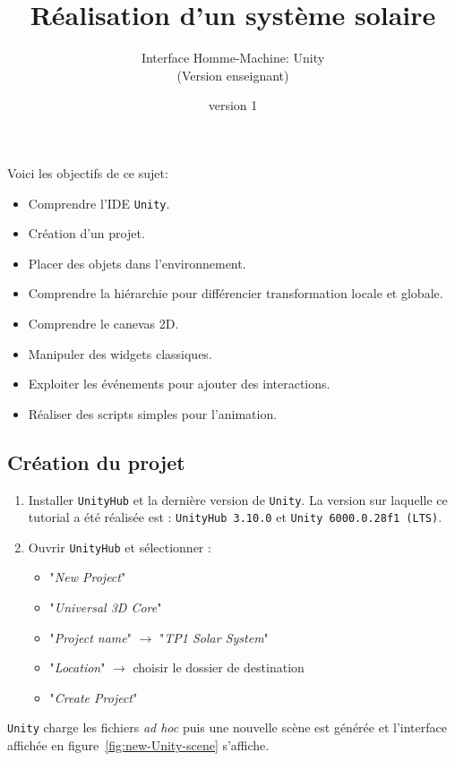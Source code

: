\documentclass[a4paper,10pt]{article}
\newenvironment{solution}%
{\begin{tcolorbox}[breakable,colback=red!5!white,colframe=red!75!black,title=Solution]}%
{\end{tcolorbox}}
\begin{document}
	


\title{\vspace*{-1cm}Réalisation d'un système solaire}
\author{\vspace*{-1.5cm}Interface Homme-Machine: Unity
\begin{ensnote}
	(Version enseignant)
\end{ensnote}
}
\date{\vspace*{-1.5cm}version 1}
\maketitle
\thispagestyle{fancy}


Voici les objectifs de ce sujet:
\begin{itemize}
	\item Comprendre l'IDE \texttt{Unity}.
	\item Création d'un projet.
	\item Placer des objets dans l'environnement.
	\item Comprendre la hiérarchie pour différencier transformation locale et globale.
	\item Comprendre le canevas 2D.
	\item Manipuler des widgets classiques.
	\item Exploiter les événements pour ajouter des interactions.
	\item Réaliser des scripts simples pour l'animation.
\end{itemize}


\ifversionenseignant
\begin{solution}
\section{Création du projet}

\begin{enumerate}
	\item Installer  \texttt{UnityHub} et la dernière version de \texttt{Unity}. La version sur laquelle ce tutorial a été réalisée est : \texttt{UnityHub 3.10.0} et \texttt{Unity 6000.0.28f1 (LTS)}.
	\item  Ouvrir \texttt{UnityHub} et sélectionner :
	\begin{itemize}
		\item "\textit{New Project}"
		\item "\textit{Universal 3D Core}"
		\item "\textit{Project name}" $\rightarrow$ "\textit{TP1 Solar System}"
		\item "\textit{Location}" $\rightarrow$ choisir le dossier de destination
		\item "\textit{Create Project}"		
	\end{itemize}
\end{enumerate}
	
\texttt{Unity} charge les fichiers \textit{ad hoc} puis une nouvelle scène est générée et l'interface affichée en figure~\ref{fig:new-Unity-scene} s'affiche.
\end{solution}
\end{document}
